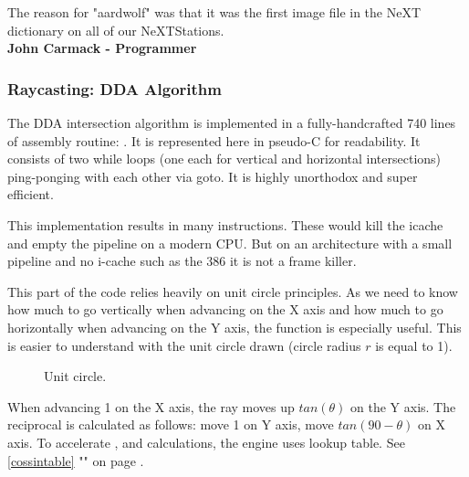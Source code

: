  \begin{fancyquotes}
The reason for "aardwolf" was that it was the first image file in the NeXT dictionary on all of our NeXTStations.
\bigskip \\
\textbf{John Carmack - Programmer}
 \end{fancyquotes}













 
 
 
 
 
 
 
 
\subsubsection{Raycasting: DDA Algorithm}
The DDA intersection algorithm is implemented in a fully-handcrafted 740 lines of assembly routine: . It is represented here in pseudo-C for readability. It consists of two while loops (one each for vertical and horizontal intersections) ping-ponging with each other via goto. It is highly unorthodox and super efficient.\\
\par



\begin{minipage}{\textwidth}

\end{minipage}
This implementation results in many  instructions. These would kill the icache and empty the pipeline on a modern CPU. But on an architecture with a small pipeline and no i-cache such as the 386 it is not a frame killer.\\
\par
This part of the code relies heavily on unit circle principles. As we need to know how much to go vertically when advancing on the X axis and how much to go horizontally when advancing on the Y axis, the  function is especially useful. This is easier to understand with the unit circle drawn (circle radius $r$ is equal to 1).
\label{unit_circle}
\begin{figure}[H]
\centering
 
 \caption{Unit circle.}
\end{figure}
\par
When advancing 1 on the X axis, the ray moves up $tan(\theta)$ on the Y axis. The reciprocal is calculated as follows: move 1 on Y axis, move $tan(90-\theta)$ on X axis. To accelerate ,  and  calculations, the engine uses lookup table. See \ref{cossintable} "" on page \pageref{cossintable}.




















